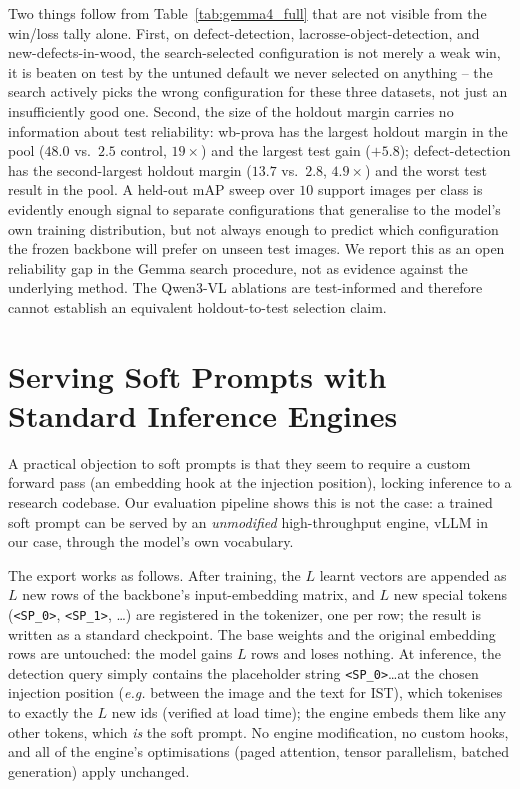 \documentclass{article}
\newcommand{\qwen}{Qwen3-VL}
\newcommand{\eg}{\textit{e.g.}}
\begin{document}
Two things follow from Table~\ref{tab:gemma4_full} that are not visible from the win/loss tally alone.
First, on defect-detection, lacrosse-object-detection, and new-defects-in-wood, the search-selected configuration is not merely a weak win, it is beaten on test by the untuned default we never selected on anything -- the search actively picks the wrong configuration for these three datasets, not just an insufficiently good one.
Second, the size of the holdout margin carries no information about test reliability: wb-prova has the largest holdout margin in the pool ($48.0$ vs.\ $2.5$ control, $19{\times}$) and the largest test gain ($+5.8$); defect-detection has the second-largest holdout margin ($13.7$ vs.\ $2.8$, $4.9{\times}$) and the worst test result in the pool.
A held-out mAP sweep over $10$ support images per class is evidently enough
signal to separate configurations that generalise to the model's own training
distribution, but not always enough to predict which configuration the frozen
backbone will prefer on unseen test images.
We report this as an open reliability gap in the Gemma search procedure, not
as evidence against the underlying method. The \qwen{} ablations are
test-informed and therefore cannot establish an equivalent holdout-to-test
selection claim.

\section{Serving Soft Prompts with Standard Inference Engines}
\label{app:vllm}

A practical objection to soft prompts is that they seem to require a custom forward pass (an embedding hook at the injection position), locking inference to a research codebase.
Our evaluation pipeline shows this is not the case: a trained soft prompt can be served by an \emph{unmodified} high-throughput engine, vLLM in our case, through the model's own vocabulary.

The export works as follows.
After training, the $L$ learnt vectors are appended as $L$ new rows of the backbone's input-embedding matrix, and $L$ new special tokens (\texttt{<SP\_0>}, \texttt{<SP\_1>}, \ldots) are registered in the tokenizer, one per row; the result is written as a standard checkpoint.
The base weights and the original embedding rows are untouched: the model gains $L$ rows and loses nothing.
At inference, the detection query simply contains the placeholder string \texttt{<SP\_0>}\ldots at the chosen injection position (\eg{} between the image and the text for IST), which tokenises to exactly the $L$ new ids (verified at load time); the engine embeds them like any other tokens, which \emph{is} the soft prompt.
No engine modification, no custom hooks, and all of the engine's optimisations (paged attention, tensor parallelism, batched generation) apply unchanged.
\end{document}
